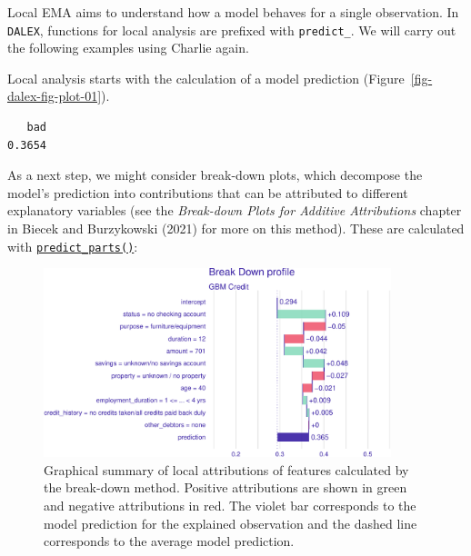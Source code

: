 Local EMA aims to understand how a model behaves for a single
observation. In \texttt{DALEX}, functions for local analysis are
prefixed with \texttt{predict\_}. We will carry out the following
examples using Charlie again.

Local analysis starts with the calculation of a model prediction
(Figure~\ref{fig-dalex-fig-plot-01}).

\begin{Shaded}
\begin{Highlighting}[]
\end{Highlighting}
\end{Shaded}

\begin{verbatim}
   bad 
0.3654 
\end{verbatim}

As a next step, we might consider break-down plots, which decompose the
model's prediction into contributions that can be attributed to
different explanatory variables (see the \emph{Break-down Plots for
Additive Attributions} chapter in Biecek and Burzykowski (2021) for more
on this method). These are calculated with
\href{https://www.rdocumentation.org/packages/DALEX/topics/predict_parts}{\texttt{predict\_parts()}}:

\begin{Shaded}
\begin{Highlighting}[]
\NormalTok{(}
\end{Highlighting}
\end{Shaded}

\begin{figure}[H]

{\centering \includegraphics[width=0.9\textwidth,height=\textheight]{chapters/chapter12/model_interpretation_files/figure-pdf/fig-dalex-breakdown-1.pdf}

}

\caption{\label{fig-dalex-breakdown}Graphical summary of local
attributions of features calculated by the break-down method. Positive
attributions are shown in green and negative attributions in red. The
violet bar corresponds to the model prediction for the explained
observation and the dashed line corresponds to the average model
prediction.}

\end{figure}

